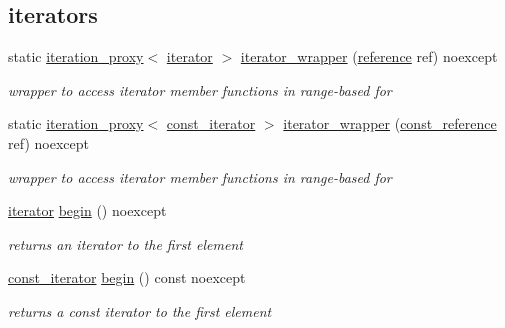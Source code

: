\subsection*{iterators}
\begin{DoxyCompactItemize}
\item 
static \hyperlink{classnlohmann_1_1basic__json_afb49d897bc58d6678f4471925bbfbb01}{iteration\+\_\+proxy}$<$ \hyperlink{classnlohmann_1_1basic__json_a099316232c76c034030a38faa6e34dca}{iterator} $>$ \hyperlink{classnlohmann_1_1basic__json_a5e4212986136ca1220f351c60e89906b}{iterator\+\_\+wrapper} (\hyperlink{classnlohmann_1_1basic__json_ac6a5eddd156c776ac75ff54cfe54a5bc}{reference} ref) noexcept
\begin{DoxyCompactList}\small\item\em wrapper to access iterator member functions in range-\/based for \end{DoxyCompactList}\item 
static \hyperlink{classnlohmann_1_1basic__json_afb49d897bc58d6678f4471925bbfbb01}{iteration\+\_\+proxy}$<$ \hyperlink{classnlohmann_1_1basic__json_a41a70cf9993951836d129bb1c2b3126a}{const\+\_\+iterator} $>$ \hyperlink{classnlohmann_1_1basic__json_a4d8795ce15be7ce2a95260663bde640d}{iterator\+\_\+wrapper} (\hyperlink{classnlohmann_1_1basic__json_a4057c5425f4faacfe39a8046871786ca}{const\+\_\+reference} ref) noexcept
\begin{DoxyCompactList}\small\item\em wrapper to access iterator member functions in range-\/based for \end{DoxyCompactList}\item 
\hyperlink{classnlohmann_1_1basic__json_a099316232c76c034030a38faa6e34dca}{iterator} \hyperlink{classnlohmann_1_1basic__json_a0ff28dac23f2bdecee9564d07f51dcdc}{begin} () noexcept
\begin{DoxyCompactList}\small\item\em returns an iterator to the first element \end{DoxyCompactList}\item 
\hyperlink{classnlohmann_1_1basic__json_a41a70cf9993951836d129bb1c2b3126a}{const\+\_\+iterator} \hyperlink{classnlohmann_1_1basic__json_a4f0f5dd42b2987ff20306ed78bd31d1d}{begin} () const noexcept
\begin{DoxyCompactList}\small\item\em returns a const iterator to the first element \end{DoxyCompactList}\item 

\end{DoxyCompactItemize}
